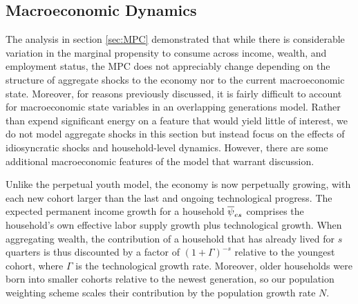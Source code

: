 \documentclass[12pt,titlepage]{econtex}
\begin{document}
\subsection{Macroeconomic Dynamics}

The analysis in section \ref{sec:MPC} demonstrated that while there is considerable variation in the marginal propensity to consume across income, wealth, and employment status, the MPC does not appreciably change depending on the structure of aggregate shocks to the economy nor to the current macroeconomic state.  Moreover, for reasons previously discussed, it is fairly difficult to account for macroeconomic state variables in an overlapping generations model.  Rather than expend significant energy on a feature that would yield little of interest, we do not model aggregate shocks in this section but instead focus on the effects of idiosyncratic shocks and household-level dynamics.  However, there are some additional macroeconomic features of the model that warrant discussion.

Unlike the perpetual youth model, the economy is now perpetually growing, with each new cohort larger than the last and ongoing technological progress.  The expected permanent income growth for a household $\overline{\psi}_{es}$ comprises the household's own effective labor supply growth plus technological growth.  When aggregating wealth, the contribution of a household that has already lived for $s$ quarters is thus discounted by a factor of $(1 + \Gamma)^{-s}$ relative to the youngest cohort, where $\Gamma$ is the technological growth rate.  Moreover, older households were born into smaller cohorts relative to the newest generation, so our population weighting scheme scales their contribution by the population growth rate $N$.
\end{document}
